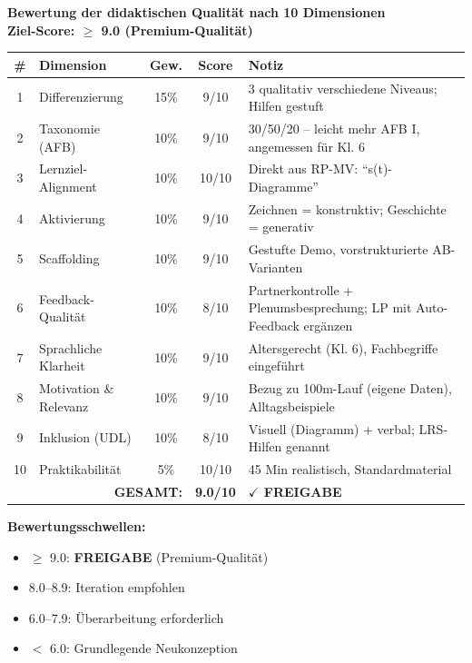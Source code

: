 \documentclass[11pt,a4paper]{article}
\begin{document}
\begin{scorebox}
\textbf{Bewertung der didaktischen Qualität nach 10 Dimensionen}\\
\textbf{Ziel-Score: $\geq$ 9.0 (Premium-Qualität)}

\vspace{1em}
\begin{tabular}{|c|l|c|c|p{4.5cm}|}
\hline
\textbf{\#} & \textbf{Dimension} & \textbf{Gew.} & \textbf{Score} & \textbf{Notiz} \\
\hline
1 & Differenzierung & 15\% & 9/10 & 3 qualitativ verschiedene Niveaus; Hilfen gestuft \\
\hline
2 & Taxonomie (AFB) & 10\% & 9/10 & 30/50/20 -- leicht mehr AFB I, angemessen für Kl. 6 \\
\hline
3 & Lernziel-Alignment & 10\% & 10/10 & Direkt aus RP-MV: ``s(t)-Diagramme'' \\
\hline
4 & Aktivierung & 10\% & 9/10 & Zeichnen = konstruktiv; Geschichte = generativ \\
\hline
5 & Scaffolding & 10\% & 9/10 & Gestufte Demo, vorstrukturierte AB-Varianten \\
\hline
6 & Feedback-Qualität & 10\% & 8/10 & Partnerkontrolle + Plenumsbesprechung; LP mit Auto-Feedback ergänzen \\
\hline
7 & Sprachliche Klarheit & 10\% & 9/10 & Altersgerecht (Kl. 6), Fachbegriffe eingeführt \\
\hline
8 & Motivation \& Relevanz & 10\% & 9/10 & Bezug zu 100m-Lauf (eigene Daten), Alltagsbeispiele \\
\hline
9 & Inklusion (UDL) & 10\% & 8/10 & Visuell (Diagramm) + verbal; LRS-Hilfen genannt \\
\hline
10 & Praktikabilität & 5\% & 10/10 & 45 Min realistisch, Standardmaterial \\
\hline
\multicolumn{3}{|r|}{\textbf{GESAMT:}} & \textbf{9.0/10} & \textcolor{successgreen}{\textbf{$\checkmark$ FREIGABE}} \\
\hline
\end{tabular}

\vspace{1em}
\textbf{Bewertungsschwellen:}
\begin{itemize}
    \item[\checkmark] \textcolor{successgreen}{$\geq$ 9.0: \textbf{FREIGABE} (Premium-Qualität)}
    \item[$\Box$] \textcolor{warningorange}{8.0--8.9: Iteration empfohlen}
    \item[$\Box$] 6.0--7.9: Überarbeitung erforderlich
    \item[$\Box$] $<$ 6.0: Grundlegende Neukonzeption
\end{itemize}
\end{scorebox}
\end{document}
